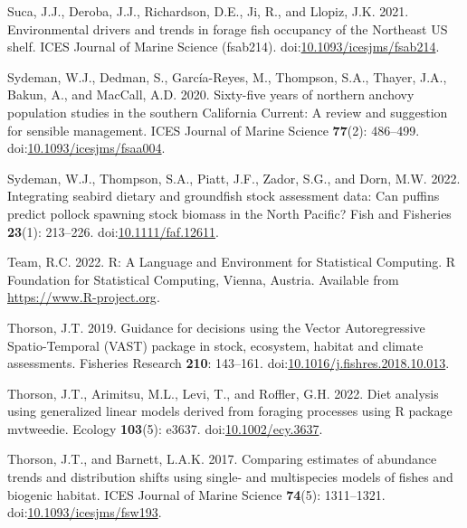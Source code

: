 \documentclass[
]{article}
\newlength{\cslhangindent}
\newlength{\cslentryspacingunit} %
\newenvironment{CSLReferences}[2] %
 {%
  \setlength{\parindent}{0pt}
  \ifodd #1
  \let\oldpar\par
  \def\par{\hangindent=\cslhangindent\oldpar}
  \fi
  \setlength{\parskip}{#2\cslentryspacingunit}
 }%
 {}
\begin{document}
\begin{CSLReferences}{1}{0}
\leavevmode{}%
Suca, J.J., Deroba, J.J., Richardson, D.E., Ji, R., and Llopiz, J.K. 2021. Environmental drivers and trends in forage fish occupancy of the {Northeast} {US} shelf. ICES Journal of Marine Science (fsab214). doi:\href{https://doi.org/10.1093/icesjms/fsab214}{10.1093/icesjms/fsab214}.

\leavevmode{}%
Sydeman, W.J., Dedman, S., García-Reyes, M., Thompson, S.A., Thayer, J.A., Bakun, A., and MacCall, A.D. 2020. Sixty-five years of northern anchovy population studies in the southern {California} {Current}: A review and suggestion for sensible management. ICES Journal of Marine Science \textbf{77}(2): 486--499. doi:\href{https://doi.org/10.1093/icesjms/fsaa004}{10.1093/icesjms/fsaa004}.

\leavevmode{}%
Sydeman, W.J., Thompson, S.A., Piatt, J.F., Zador, S.G., and Dorn, M.W. 2022. Integrating seabird dietary and groundfish stock assessment data: {Can} puffins predict pollock spawning stock biomass in the {North} {Pacific}? Fish and Fisheries \textbf{23}(1): 213--226. doi:\href{https://doi.org/10.1111/faf.12611}{10.1111/faf.12611}.

\leavevmode{}%
Team, R.C. 2022. R: {A} {Language} and {Environment} for {Statistical} {Computing}. R Foundation for Statistical Computing, Vienna, Austria. Available from \url{https://www.R-project.org}.

\leavevmode{}%
Thorson, J.T. 2019. Guidance for decisions using the {Vector} {Autoregressive} {Spatio}-{Temporal} ({VAST}) package in stock, ecosystem, habitat and climate assessments. Fisheries Research \textbf{210}: 143--161. doi:\href{https://doi.org/10.1016/j.fishres.2018.10.013}{10.1016/j.fishres.2018.10.013}.

\leavevmode{}%
Thorson, J.T., Arimitsu, M.L., Levi, T., and Roffler, G.H. 2022. Diet analysis using generalized linear models derived from foraging processes using {R} package mvtweedie. Ecology \textbf{103}(5): e3637. doi:\href{https://doi.org/10.1002/ecy.3637}{10.1002/ecy.3637}.

\leavevmode{}%
Thorson, J.T., and Barnett, L.A.K. 2017. Comparing estimates of abundance trends and distribution shifts using single- and multispecies models of fishes and biogenic habitat. ICES Journal of Marine Science \textbf{74}(5): 1311--1321. doi:\href{https://doi.org/10.1093/icesjms/fsw193}{10.1093/icesjms/fsw193}.


\end{CSLReferences}
\end{document}
